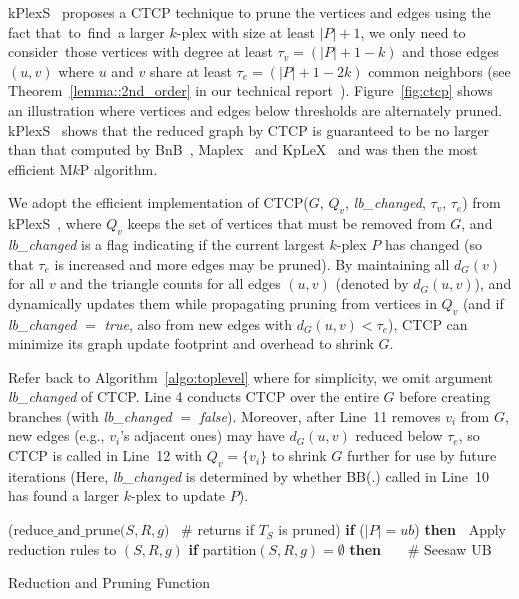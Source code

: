 \documentclass[sigconf, nonacm]{acmart}
\begin{document}
\vspace{1mm}
 kPlexS~\cite{kPlexS} proposes a CTCP technique to prune the vertices and edges using the fact that~to~find~a 
larger $k$-plex with size at least $|P|+1$, we only need to consider~those
vertices with degree at least $\tau_v=(|P|+1-k)$ and those edges~$(u, v)$ where $u$ and $v$ share at least $\tau_e=(|P|+1-2k)$ common neighbors (see Theorem~\ref{lemma::2nd_order} in our technical report~\cite{tech_report}). Figure~\ref{fig:ctcp} shows an illustration where vertices and edges below thresholds are alternately pruned. kPlexS~\cite{kPlexS} shows that the reduced graph by CTCP is guaranteed to be no larger than that computed by BnB~\cite{BnB}, Maplex~\cite{Maplex} and KpLeX~\cite{Maplex} and was then the most efficient M$k$P algorithm.

We adopt the efficient implementation of CTCP($G$, $Q_v$, {\em lb\_changed}, $\tau_v$, $\tau_e$) from kPlexS~\cite{kPlexS}, where $Q_{v}$ keeps the set of vertices that must be removed from $G$, and {\em lb\_changed} is a flag indicating if the current largest $k$-plex $P$ has changed (so that $\tau_e$ is increased and more edges may be pruned). By maintaining all $d_G(v)$ for all $v$ and the triangle counts for all edges $(u, v)$ (denoted by $d_G(u, v)$), and dynamically updates them while propagating pruning from vertices in $Q_{v}$ (and if {\em lb\_changed} $=$ {\em true}, also from new edges with $d_G(u, v)<\tau_e$), CTCP can minimize its graph update footprint and overhead to shrink $G$.

Refer back to Algorithm~\ref{algo:toplevel} where for simplicity, we omit argument {\em lb\_changed} of CTCP. Line 4 conducts CTCP over the entire $G$ before creating branches (with {\em lb\_changed} $=$ {\em false}). Moreover, after Line~11 removes $v_i$ from $G$, new edges (e.g., $v_i$'s adjacent ones) may have $d_G(u, v)$ reduced below $\tau_e$, so CTCP is called in Line~12 with $Q_v=\{v_i\}$ to shrink $G$ further for use by future iterations (Here, {\em lb\_changed} is determined by whether BB(.) called in Line~10 has found a larger $k$-plex to update $P$).

\begin{algorithm}[!t]
  \DontPrintSemicolon
  \Begin($\text{reduce\_and\_prune}{(}S, R, g{)}$ \ \# returns if $T_S$ is pruned){ %
  {\bf if} ($|P|=ub$) {\bf then\ } \;
  Apply reduction rules to $(S, R, g)$\;
  {\bf if} partition$(S, R, g) = \emptyset$ {\bf then\ }  \ \ \# Seesaw UB\;
}
\caption{Reduction and Pruning Function}    
\label{algo:reduce-and-prune}
\end{algorithm}
\setlength{\textfloatsep}{0pt}
\end{document}
